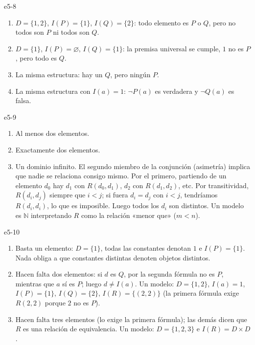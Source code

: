 \begin{solucion}{e5-8}
\begin{enumerate}
    \item $D = \{1, 2\}$, $I(P) = \{1\}$, $I(Q) = \{2\}$: todo elemento es $P$ o $Q$, pero no todos son $P$ ni todos son $Q$.
    \item $D = \{1\}$, $I(P) = \varnothing$, $I(Q) = \{1\}$: la premisa universal se cumple, $1$ no es $P$, pero todo es $Q$.
    \item La misma estructura: hay un $Q$, pero ningún $P$.
    \item La misma estructura con $I(a) = 1$: $\neg P(a)$ es verdadera y $\neg Q(a)$ es falsa.
\end{enumerate}
\end{solucion}

\begin{solucion}{e5-9}
\begin{enumerate}
    \item Al menos dos elementos.
    \item Exactamente dos elementos.
    \item Un dominio infinito. El segundo miembro de la conjunción (asimetría) implica que nadie se relaciona consigo mismo. Por el primero, partiendo de un elemento $d_0$ hay $d_1$ con $R(d_0, d_1)$, $d_2$ con $R(d_1, d_2)$, etc. Por transitividad, $R(d_i, d_j)$ siempre que $i < j$; si fuera $d_i = d_j$ con $i < j$, tendríamos $R(d_i, d_i)$, lo que es imposible. Luego todos los $d_i$ son distintos. Un modelo es $\mathbb{N}$ interpretando $R$ como la relación «menor que» ($m < n$).
\end{enumerate}
\end{solucion}

\begin{solucion}{e5-10}
\begin{enumerate}
    \item Basta un elemento: $D = \{1\}$, todas las constantes denotan $1$ e $I(P) = \{1\}$. Nada obliga a que constantes distintas denoten objetos distintos.
    \item Hacen falta dos elementos: si $d$ es $Q$, por la segunda fórmula no es $P$, mientras que $a$ sí es $P$; luego $d \neq I(a)$. Un modelo: $D = \{1, 2\}$, $I(a) = 1$, $I(P) = \{1\}$, $I(Q) = \{2\}$, $I(R) = \{(2, 2)\}$ (la primera fórmula exige $R(2, 2)$ porque $2$ no es $P$).
    \item Hacen falta tres elementos (lo exige la primera fórmula); las demás dicen que $R$ es una relación de equivalencia. Un modelo: $D = \{1, 2, 3\}$ e $I(R) = D \times D$.
\end{enumerate}
\end{solucion}

